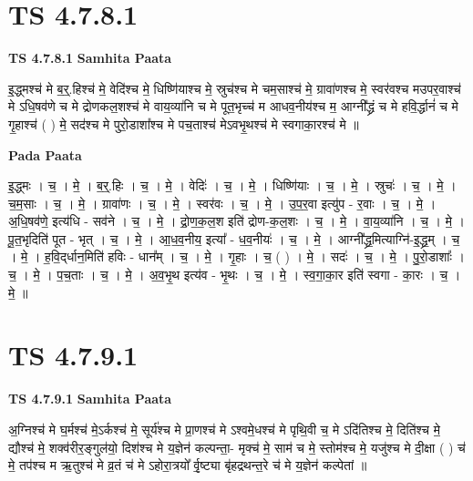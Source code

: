 \documentclass[17pt]{extarticle}
\begin{document}
\section*{ TS 4.7.8.1 }

\textbf{TS 4.7.8.1 } \newline
\textbf{Samhita Paata} \newline

इ॒द्ध्मश्च॑ मे ब॒र्॒.हिश्च॑ मे॒ वेदि॑श्च मे॒ धिष्णि॑याश्च मे॒ स्रुच॑श्च मे चम॒साश्च॑ मे॒ ग्रावा॑णश्च मे॒ स्वर॑वश्च मउपर॒वाश्च॑ मे ऽधि॒षव॑णे च मे द्रोणकल॒शश्च॑ मे वाय॒व्या॑नि च मे पूत॒भृच्च॑ म आधव॒नीय॑श्च म॒ आग्नी᳚द्ध्रं च मे हवि॒र्द्धानं॑ च मे गृ॒हाश्च॑ ( ) मे॒ सद॑श्च मे पुरो॒डाशा᳚श्च मे पच॒ताश्च॑ मेऽवभृ॒थश्च॑ मे स्वगाका॒रश्च॑ मे ॥ \newline

\textbf{Pada Paata} \newline

इ॒द्ध्मः । च॒ । मे॒ । ब॒र्॒.हिः । च॒ । मे॒ । वेदिः॑ । च॒ । मे॒ । धिष्णि॑याः । च॒ । मे॒ । स्रुचः॑ । च॒ । मे॒ । च॒म॒साः । च॒ । मे॒ । ग्रावा॑णः । च॒ । मे॒ । स्वर॑वः । च॒ । मे॒ । उ॒प॒र॒वा इत्यु॑प - र॒वाः । च॒ । मे॒ । अ॒धि॒षव॑णे॒ इत्य॑धि - सव॑ने । च॒ । मे॒ । द्रो॒ण॒क॒ल॒श इति॑ द्रोण-क॒ल॒शः । च॒ । मे॒ । वा॒य॒व्या॑नि । च॒ । मे॒ । पू॒त॒भृदिति॑ पूत - भृत् । च॒ । मे॒ । आ॒ध॒व॒नीय॒ इत्या᳚ - ध॒व॒नीयः॑ । च॒ । मे॒ । आग्नी᳚द्ध्र॒मित्याग्नि॑-इ॒द्ध्र॒म् । च॒ । मे॒ । ह॒वि॒द्‌र्धान॒मिति॑ हविः - धान᳚म् । च॒ । मे॒ । गृ॒हाः । च॒ ( ) । मे॒ । सदः॑ । च॒ । मे॒ । पु॒रो॒डाशाः᳚ । च॒ । मे॒ । प॒च॒ताः । च॒ । मे॒ । अ॒व॒भृ॒थ इत्य॑व - भृ॒थः । च॒ । मे॒ । स्व॒गा॒का॒र इति॑ स्वगा - का॒रः । च॒ । मे॒ ॥  \newline




\section*{ TS 4.7.9.1 }

\textbf{TS 4.7.9.1 } \newline
\textbf{Samhita Paata} \newline

अ॒ग्निश्च॑ मे घ॒र्मश्च॑ मे॒ऽर्कश्च॑ मे॒ सूर्य॑श्च मे प्रा॒णश्च॑ मे ऽश्वमे॒धश्च॑ मे पृथि॒वी च॒ मे ऽदि॑तिश्च मे॒ दिति॑श्च मे॒ द्यौश्च॑ मे॒ शक्व॑रीर॒ङ्गुल॑यो॒ दिश॑श्च मे     य॒ज्ञेन॑ कल्पन्ता॒- मृक्च॑ मे॒ साम॑ च मे॒ स्तोम॑श्च मे॒ यजु॑श्च मे दी॒क्षा ( ) च॑ मे॒ तप॑श्च म ऋ॒तुश्च॑ मे व्र॒तं च॑ मे ऽहोरा॒त्रयो᳚ र्वृ॒ष्ट्या बृ॑हद्रथन्त॒रे च॑ मे य॒ज्ञेन॑ कल्पेतां ॥ \newline
\end{document}
